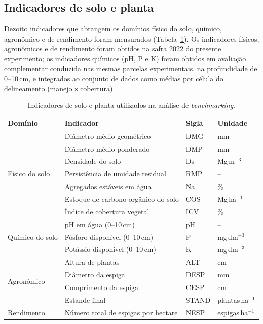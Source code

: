 \documentclass[pdflatex,sn-basic]{sn-jnl}%
\begin{document}
\subsection{Indicadores de solo e planta}\label{subsec:indicators}

Dezoito indicadores que abrangem os domínios físico do solo, químico, agronômico e de rendimento foram mensurados (Tabela~\ref{tab:indicators}). Os indicadores físicos, agronômicos e de rendimento foram obtidos na safra 2022 do presente experimento; os indicadores químicos (pH, P e K) foram obtidos em avaliação complementar conduzida nas mesmas parcelas experimentais, na profundidade de 0--10\,cm, e integrados ao conjunto de dados como médias por célula do delineamento (manejo\,$\times$\,cobertura).

\begin{table}[h]
\caption{Indicadores de solo e planta utilizados na análise de \textit{benchmarking}.}\label{tab:indicators}
\begin{tabular*}{\textwidth}{@{\extracolsep\fill}llll}
\toprule
Domínio & Indicador & Sigla & Unidade \\
\midrule
\multirow{7}{*}{Físico do solo} 
  & Diâmetro médio geométrico & DMG & mm \\
  & Diâmetro médio ponderado & DMP & mm \\
  & Densidade do solo & Ds & Mg\,m$^{-3}$ \\
  & Persistência de umidade residual & RMP & -- \\
  & Agregados estáveis em água & Na & \% \\
  & Estoque de carbono orgânico do solo & COS & Mg\,ha$^{-1}$ \\
  & Índice de cobertura vegetal & ICV & \% \\
\midrule
\multirow{3}{*}{Químico do solo}
  & pH em água (0--10\,cm) & pH & -- \\
  & Fósforo disponível (0--10\,cm) & P & mg\,dm$^{-3}$ \\
  & Potássio disponível (0--10\,cm) & K & mg\,dm$^{-3}$ \\
\midrule
\multirow{4}{*}{Agronômico} 
  & Altura de plantas & ALT & cm \\
  & Diâmetro da espiga & DESP & mm \\
  & Comprimento da espiga & CESP & cm \\
  & Estande final & STAND & plantas\,ha$^{-1}$ \\
\midrule
\multirow{4}{*}{Rendimento} 
  & Número total de espigas por hectare & NESP & espigas\,ha$^{-1}$ \\

\end{tabular*}
\end{table}
\end{document}
